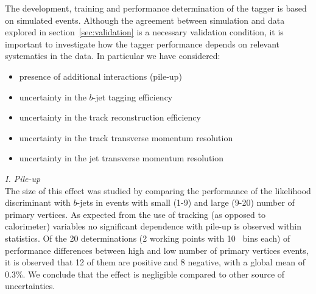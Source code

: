The development, training and performance determination of the tagger is based on simulated events. Although the agreement between simulation and data explored in section~\ref{sec:validation} is a necessary validation condition, it is important to investigate how the tagger performance depends on relevant systematics in the data. In particular we have considered:
%
%
\begin{itemize}\addtolength{\itemsep}{-0.4\baselineskip}
\item
presence of additional interactions (pile-up)
\item
uncertainty in the $b$-jet tagging efficiency %
\item
uncertainty in the track reconstruction efficiency
\item
uncertainty in the track transverse momentum resolution
\item
uncertainty in the jet transverse momentum resolution  
\end{itemize}

{ \em I. Pile-up}
\\[3mm]
  The size of this effect was studied by comparing the performance of the likelihood discriminant with $b$-jets in events with small (1-9) and large (9-20) number of primary vertices. 
As expected from the use of tracking (as opposed to calorimeter) variables no significant dependence with pile-up is observed within statistics. Of the 20 determinations (2 working points with 10 \pt\ bins each) of performance differences between high and low number of primary vertices events, it is observed that 12 of them are positive and 8 negative, with a global mean of 0.3\%. We conclude that the effect is negligible compared to other source of uncertainties.
%

